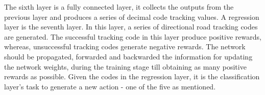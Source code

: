 \documentclass{svproc}
\newcommand{\tl}[1]{\textcolor{blue} {TL: #1 :TL} }
\begin{document}
	The sixth layer is a fully connected layer, it collects the outputs from the previous layer and produces a series of decimal code tracking values. A regression layer is the seventh layer. In this layer, a series of directional road tracking codes are generated. The successful tracking code in this layer produce positive rewards, whereas, unsuccessful tracking codes generate negative rewards. The network should be propagated, forwarded and backwarded the information for updating the network weights, during the training stage till obtaining as many positive rewards as possible. Given the codes in the regression layer, it is the classification layer's task to generate a new action - one of the five as mentioned. 
\end{document}
